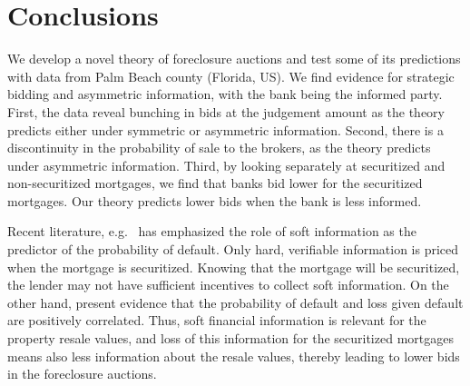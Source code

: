 \documentclass[11pt,twopage]{article}
\begin{document}
%
%
%
%
\section{Conclusions}

We develop a novel theory of foreclosure auctions and test some of its predictions with data from Palm Beach county (Florida, US). We find evidence for strategic bidding and asymmetric information, with the bank being the informed party. First, the data reveal bunching in bids at the judgement amount as the theory predicts either under symmetric or asymmetric information. Second, there is a discontinuity in the probability of sale to the brokers, as the theory predicts under asymmetric information. Third, by looking separately at securitized and non-securitized mortgages, we find that banks bid lower for the securitized mortgages. Our theory predicts lower bids when the bank is less informed.

Recent literature, e.g.\ \cite{keys2008did} has emphasized the role of soft information as the predictor of the probability of default.  Only hard, verifiable information is priced when the mortgage is securitized. Knowing that the mortgage will be securitized, the lender may not have sufficient incentives to collect soft information. On the other hand, \cite{qi2009loss} present evidence that the probability of default and loss given default are positively correlated. Thus, soft financial information is relevant for the property resale values, and loss of this information for the securitized mortgages means also less information about the resale values, thereby leading to lower bids in the foreclosure auctions.
\end{document}
